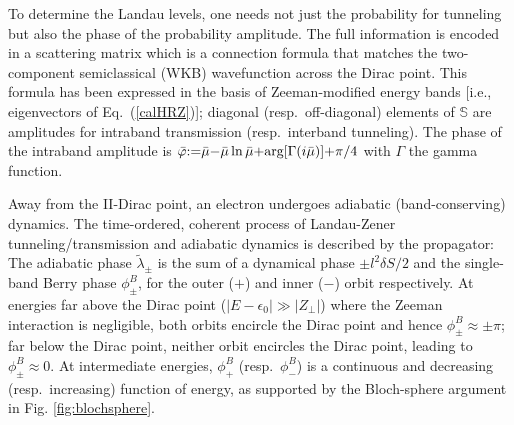 \documentclass[aps, showpacs, twocolumn, notitlepage, superscriptaddress]{revtex4-1}
\begin{document}
To determine the Landau levels, one needs not just the probability for tunneling but also the phase of the probability amplitude. The full information is encoded in a scattering matrix\cite{AALG,kaganov_coherent_1983}
which is a connection formula that matches the two-component semiclassical (WKB) wavefunction across the Dirac point. This formula  has been expressed in the basis of Zeeman-modified energy bands [i.e., eigenvectors of Eq.\ (\ref{calHRZ})]; diagonal (resp.\ off-diagonal) elements of $\mathbb{S}$ are amplitudes for intraband transmission (resp.\ interband tunneling). The phase of the intraband amplitude is $\bar{\varphi}{:}{=}\bar{\mu}{-}\bar{\mu}\ln\bar{\mu}{+}\text{arg}[\Gamma(i\bar{\mu})]{+}\pi/4$ with $\Gamma$ the gamma function.

Away from the II-Dirac point, an electron undergoes adiabatic (band-conserving) dynamics. The time-ordered, coherent process of Landau-Zener tunneling/transmission and adiabatic dynamics is described by the propagator:
The adiabatic phase $\tilde{\lambda}_{\pm}$ is the sum of a dynamical phase ${\pm} l^2 \delta S/2$ and  the single-band Berry phase $\phi^B_\pm$, for the outer ($+$) and inner ($-$) orbit respectively. At energies far above the Dirac point ($|E{-}\epsilon_0|{\gg}|Z_{\perp}|$) where the Zeeman interaction is negligible, both orbits encircle the Dirac point and hence $\phi_{\pm}^B{\approx}{\pm}\pi$; far below the Dirac point, neither orbit encircles the Dirac point, leading to $\phi_{\pm}^B{\approx}0$. At intermediate energies, $\phi_{+}^B$ (resp.\ $\phi_{-}^B$) is a continuous and decreasing (resp.\ increasing) function of energy, as supported by the Bloch-sphere argument in Fig. \ref{fig:blochsphere}.
\end{document}
